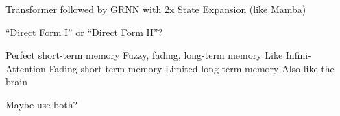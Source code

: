 \begin{slide}[\slideopts,toc={TransMamba}]{Transformer followed by GRNN with 2x State Expansion (like Mamba)}
\vspace{-1.6em}
\vspace{-2em}
\maybepause
\end{slide}


\begin{slide}[\slideopts,toc={Direct Forms}]{``Direct Form I'' or ``Direct Form II''?}
  \vspace{-1.6em}
  \vspace{-2em}
  \begin{multicols}{2}
    \begin{itemize}
    \mpitem Perfect short-term memory
    \mpitem Fuzzy, fading, long-term memory
    \mpitem Like Infini-Attention
      \columnbreak
    \mpitem Fading short-term memory
    \mpitem Limited long-term memory
    \mpitem Also like the brain
    \end{itemize}
  \end{multicols}
  \maybepause
  Maybe use both?
\end{slide}

